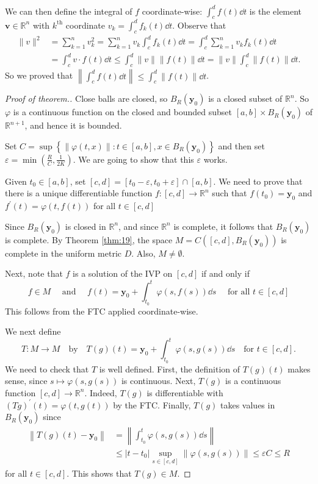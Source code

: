 \documentclass[a4paper]{article}
\begin{document}
We can then define the integral of $f$ coordinate-wise: $\int_c^d f(t) \dd t$ is the element $\mathbf{v} \in \mathbb{R}^n$ with $k^{\text {th}}$ coordinate $v_k=\int_c^d f_k(t) \dd t$. Observe that
\[
\begin{aligned}
\|v\|^2 &=\sum_{k=1}^n v_k^2=\sum_{k=1}^n v_k \int_c^d f_k(t) \dd t=\int_c^d \sum_{k=1}^n v_k f_k(t) \dd t \\
&=\int_c^d v \cdot f(t) \dd t \leqslant \int_c^d\|v\|\|f(t)\| \dd t=\|v\| \int_c^d\|f(t)\| \dd t.
\end{aligned}
\]
So we proved that $\left\|\int_c^d f(t) \dd t\right\| \leqslant \int_c^d\|f(t)\| \dd t$.

\begin{proof}[Proof of theorem.]
    Close balls are closed, so $B_R\left(\mathbf y_0\right)$ is a closed subset of $\mathbb{R}^n$. So $\varphi$ is a continuous function on the closed and bounded subset $[a, b] \times B_R\left(\mathbf y_0\right)$ of $\mathbb{R}^{n+1}$, and hence it is bounded. 
    
    Set $C=\sup \left\{\|\varphi(t, x)\|: t \in[a, b], x \in B_R\left(\mathbf y_0\right)\right\}$ and then set $\varepsilon=\min \left(\frac{R}{C}, \frac{1}{2 K}\right)$. We are going to show that this $\varepsilon$ works.

    Given $t_0 \in[a, b]$, set $[c, d]=\left[t_0-\varepsilon, t_0+\varepsilon\right] \cap[a, b]$. We need to prove that there is a unique differentiable function $f:[c, d] \rightarrow \mathbb{R}^n$ such that $f\left(t_0\right)=\mathbf y_0$ and $f^{\prime}(t)=\varphi(t, f(t))$ for all $t \in[c, d]$

    Since $B_R\left(\mathbf{y}_0\right)$ is closed in $\mathbb{R}^n$, and since $\mathbb{R}^n$ is complete, it follows that $B_R\left(\mathbf y_0\right)$ is complete. By Theorem \ref{thm:19}, the space $M=C\left([c, d], B_R\left(\mathbf y_0\right)\right)$ is complete in the uniform metric $D$. Also, $M \neq \emptyset$.

    Next, note that $f$ is a solution of the IVP on $[c, d]$ if and only if
    \[
    f \in M \quad \text { and } \quad f(t)=\mathbf y_0+\int_{t_0}^t \varphi(s, f(s)) \dd s \quad \text { for all } t \in[c, d]
    \]
    This follows from the FTC applied coordinate-wise.

    We next define
    \[
        T: M \rightarrow M \quad \text{by} \quad T(g)(t)=\mathbf y_0+\int_{t_0}^t \varphi(s, g(s)) \dd s \quad \text{for } t \in[c, d].
    \]
    We need to check that $T$ is well defined. First, the definition of $T(g)(t)$ makes sense, since
    $s \mapsto \varphi(s, g(s))$ is continuous. Next, $T(g)$ is a continuous function $[c, d] \rightarrow \mathbb{R}^n$.
    Indeed, $T(g)$ is differentiable with $(T g)^{\prime}(t)=\varphi(t, g(t))$ by the FTC. Finally, $T(g)$ takes values in $B_R\left(\mathbf y_0\right)$ since
    \begin{align*}
        \left\|T(g)(t)-\mathbf y_0\right\|&=\left\|\int_{t_0}^t \varphi(s, g(s)) \dd s\right\| \\ 
        &\leqslant\left|t-t_0\right| \sup _{s \in[c, d]}\|\varphi(s, g(s))\| \leqslant \varepsilon C \leqslant R \tag{$*$}
    \end{align*}
    for all $t \in[c, d]$. This shows that $T(g) \in M$.


\end{proof}
\end{document}
